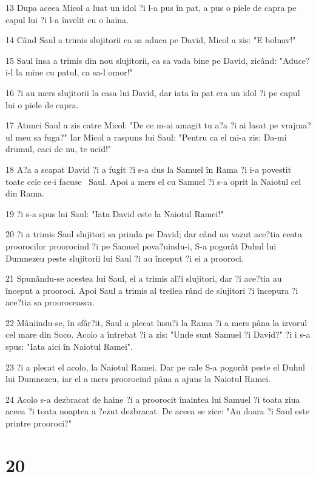 \par 13 Dupa aceea Micol a luat un idol ?i l-a pus în pat, a pus o piele de capra pe capul lui ?i l-a învelit cu o haina.
\par 14 Când Saul a trimis slujitorii ca sa aduca pe David, Micol a zis: "E bolnav!"
\par 15 Saul însa a trimis din nou slujitorii, ca sa vada bine pe David, zicând: "Aduce?i-l la mine cu patul, ca sa-l omor!"
\par 16 ?i au mers slujitorii la casa lui David, dar iata în pat era un idol ?i pe capul lui o piele de capra.
\par 17 Atunci Saul a zis catre Micol: "De ce m-ai amagit tu a?a ?i ai lasat pe vrajma?ul meu sa fuga?" Iar Micol a raspuns lui Saul: "Pentru ca el mi-a zis: Da-mi drumul, caci de nu, te ucid!"
\par 18 A?a a scapat David ?i a fugit ?i s-a dus la Samuel în Rama ?i i-a povestit toate cele ce-i facuse  Saul. Apoi a mers el cu Samuel ?i s-a oprit la Naiotul cel din Rama.
\par 19 ?i s-a spus lui Saul: "Iata David este la Naiotul Ramei!"
\par 20 ?i a trimis Saul slujitori sa prinda pe David; dar când au vazut ace?tia ceata proorocilor proorocind ?i pe Samuel pova?uindu-i, S-a pogorât Duhul lui Dumnezeu peste slujitorii lui Saul ?i au început ?i ei a prooroci.
\par 21 Spunându-se acestea lui Saul, el a trimis al?i slujitori, dar ?i ace?tia au început a prooroci. Apoi Saul a trimis al treilea rând de slujitori ?i începura ?i ace?tia sa prooroceasca.
\par 22 Mâniindu-se, în sfâr?it, Saul a plecat însu?i la Rama ?i a mers pâna la izvorul cel mare din Soco. Acolo a întrebat ?i a zis: "Unde sunt Samuel ?i David?" ?i i s-a spus: "Iata aici în Naiotul Ramei".
\par 23 ?i a plecat el acolo, la Naiotul Ramei. Dar pe cale S-a pogorât peste el Duhul lui Dumnezeu, iar el a mers proorocind pâna a ajuns la Naiotul Ramei.
\par 24 Acolo s-a dezbracat de haine ?i a proorocit înaintea lui Samuel ?i toata ziua aceea ?i toata noaptea a ?ezut dezbracat. De aceea se zice: "Au doara ?i Saul este printre prooroci?"

\chapter{20}

